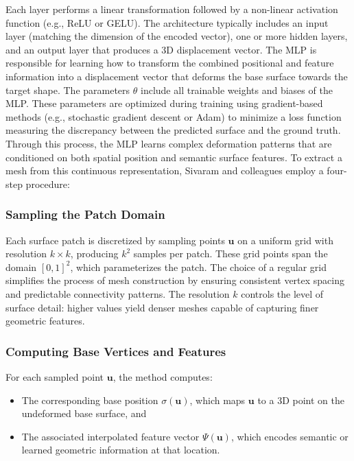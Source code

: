 Each layer performs a linear transformation followed by a non-linear activation function (e.g., ReLU or GELU). 
The architecture typically includes an input layer (matching the dimension of the encoded vector), one or more hidden layers, and an output layer that produces a 3D displacement vector. 
The MLP is responsible for learning how to transform the combined positional and feature information into a displacement vector that deforms the base surface towards the target shape. 
The parameters $\theta$ include all trainable weights and biases of the MLP. 
These parameters are optimized during training using gradient-based methods (e.g., stochastic gradient descent or Adam) to minimize a loss function measuring the discrepancy between the predicted surface and the ground truth. 
Through this process, the MLP learns complex deformation patterns that are conditioned on both spatial position and semantic surface features. 
To extract a mesh from this continuous representation, Sivaram and colleagues employ a four-step procedure: 

\subsubsection{Sampling the Patch Domain}

Each surface patch is discretized by sampling points $\mathbf{u}$ on a uniform grid with resolution $k \times k$, producing $k^2$ samples per patch. 
These grid points span the domain $[0,1]^2$, which parameterizes the patch. 
The choice of a regular grid simplifies the process of mesh construction by ensuring consistent vertex spacing and predictable connectivity patterns. 
The resolution $k$ controls the level of surface detail: higher values yield denser meshes capable of capturing finer geometric features. 

\subsubsection{Computing Base Vertices and Features}

For each sampled point $\mathbf{u}$, the method computes: 
\begin{itemize}
  \item The corresponding base position $\sigma(\mathbf{u})$, which maps $\mathbf{u}$ to a 3D point on the undeformed base surface, and 
  \item The associated interpolated feature vector $\Psi(\mathbf{u})$, which encodes semantic or learned geometric information at that location.
\end{itemize}


